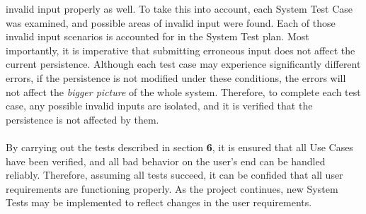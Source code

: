 \documentclass[12pt]{report}
\begin{document}
invalid input properly as well. To take this into account, each System Test Case was examined, and
possible areas of invalid input were found. Each of those invalid input scenarios is accounted for
in the System Test plan. Most importantly, it is imperative that submitting erroneous input does not
affect the current persistence. Although each test case may experience significantly different
errors, if the persistence is not modified under these conditions, the errors will not affect the
\textit{bigger picture} of the whole system. Therefore, to complete each test case, any possible
invalid inputs are isolated, and it is verified that the persistence is not affected by them.\\\\
By carrying out the tests described in section \textbf{6}, it is ensured that all Use Cases have
been verified, and all bad behavior on the user's end can be handled reliably. Therefore, assuming
all tests succeed, it can be confided that all user requirements
are functioning properly. As the project continues, new System Tests may be implemented to reflect
changes in the user requirements.
\end{document}
